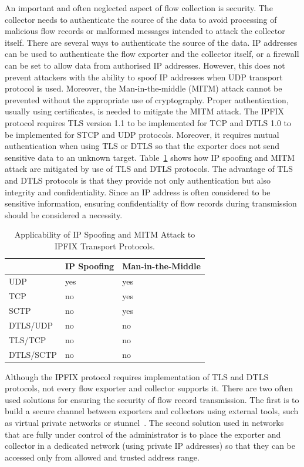 An important and often neglected aspect of flow collection is security. The collector needs to authenticate the source of the data to avoid processing of malicious flow records or malformed messages intended to attack the collector itself. There are several ways to authenticate the source of the data. IP addresses can be used to authenticate the flow exporter and the collector itself, or a firewall can be set to allow data from authorised IP addresses. However, this does not prevent attackers with the ability to spoof IP addresses when UDP transport protocol is used. Moreover, the Man-in-the-middle (MITM) attack cannot be prevented without the appropriate use of cryptography. Proper authentication, usually using certificates, is needed to mitigate the MITM attack. The IPFIX protocol requires TLS version 1.1 to be implemented for TCP and DTLS 1.0 to be implemented for STCP and UDP protocols. Moreover, it requires mutual authentication when using TLS or DTLS so that the exporter does not send sensitive data to an unknown target. Table~\ref{tab:flow.protocols.security} shows how IP spoofing and MITM attack are mitigated by use of TLS and DTLS protocols. The advantage of TLS and DTLS protocols is that they provide not only authentication but also integrity and confidentiality. Since an IP address is often considered to be sensitive information, ensuring confidentiality of flow records during transmission should be considered a necessity.

\begin{table}[t!]
    \centering
    \begin{tabular}{lll}
    \toprule
            & \textbf{IP Spoofing}    & \textbf{Man-in-the-Middle}  \\ \midrule
    UDP        & yes            & yes \\ 
    TCP        & no            & yes \\ 
    SCTP        & no            & yes \\
    DTLS/UDP    & no            & no  \\
    TLS/TCP        & no            & no  \\ 
    DTLS/SCTP    & no            & no  \\ \bottomrule
    \end{tabular}
    \caption{Applicability of IP Spoofing and MITM Attack to IPFIX Transport Protocols.}
    \label{tab:flow.protocols.security}
\end{table}

Although the IPFIX protocol requires implementation of TLS and DTLS protocols, not every flow exporter and collector supports it. There are two often used solutions for ensuring the security of flow record transmission. The first is to build a secure channel between exporters and collectors using external tools, such as virtual private networks or stunnel~\cite{Trojnar-2015-Stunnel}. The second solution used in networks that are fully under control of the administrator is to place the exporter and collector in a dedicated network (using private IP addresses) so that they can be accessed only from allowed and trusted address range.


